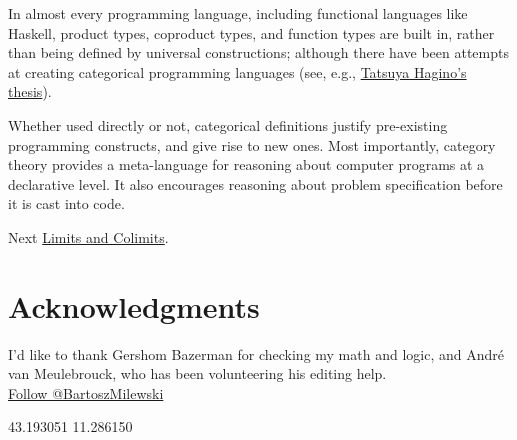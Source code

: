In almost every programming language, including functional languages
like Haskell, product types, coproduct types, and function types are
built in, rather than being defined by universal constructions; although
there have been attempts at creating categorical programming languages
(see, e.g.,
\href{http://synrc.com/publications/cat/Category\%20Theory/Type\%20Theory/Hagino\%20T.\%20A\%20Categorical\%20Programming\%20Language.pdf}{Tatsuya
Hagino's thesis}).

Whether used directly or not, categorical definitions justify
pre-existing programming constructs, and give rise to new ones. Most
importantly, category theory provides a meta-language for reasoning
about computer programs at a declarative level. It also encourages
reasoning about problem specification before it is cast into code.

Next
\href{https://bartoszmilewski.com/2015/04/15/limits-and-colimits/}{Limits
and Colimits}.

\section{Acknowledgments}\label{acknowledgments}

I'd like to thank Gershom Bazerman for checking my math and logic, and
André van Meulebrouck, who has been volunteering his editing help.\\
\href{https://twitter.com/BartoszMilewski}{Follow @BartoszMilewski}

{43.193051} {11.286150}
